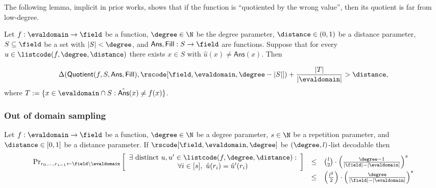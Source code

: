 The following lemma, implicit in prior works, shows that if the function is ``quotiented by the wrong value'', then its quotient is far from low-degree.

\begin{lemma}\label{lemma:quotienting}
    Let $f:\evaldomain\rightarrow\field$ be a function, $\degree\in\N$ be the degree parameter, $\distance\in(0,1)$
    be a distance parameter, $S\subseteq\field$ be a set with $|S|<\degree$, and $\mathsf{Ans},\mathsf{Fill}:S\rightarrow\field$ are functions. Suppose that for every $u\in\listcode(f,\degree,\distance)$ there exists $x\in S$ with $\hat{u}(x)\neq\mathsf{Ans}(x)$. Then

    \[
            \Delta(\mathsf{Quotient}(f,S,\mathsf{Ans},\mathsf{Fill}),\rscode[\field,\evaldomain,\degree-|S|])+\frac{|T|}{|\evaldomain|}>\distance,
    \]
    where $T:=\{x\in\evaldomain\cap S: \hat{\mathsf{Ans}}(x)\neq f(x)\}$.
\end{lemma}

\subsubsection{Out of domain sampling}\label{sec:out_of_domain_smpl}
\begin{lemma}\label{lemma:out_of_domain_smpl}
    Let $f:\evaldomain\rightarrow\field$ be a function, $\degree\in\N$ be a degree parameter, $s\in\N$ be a repetition parameter, and $\distance\in[0,1]$ be a distance parameter. If $\rscode[\field,\evaldomain,\degree]$ be $(\degree,l)$-list decodable then
        \[
        \begin{array}{rcl}
        \Pr_{\substack{r_0, \ldots, r_{s-1} \gets \field \setminus \evaldomain}}
        \left[
        \begin{array}{c}
            \exists \text{ distinct } u, u' \in \listcode(f, \degree, \distance): \\
            \forall i \in [s],\ \hat{u}(r_i) = \hat{u}'(r_i)
        \end{array}
        \right]
        & \leq & \binom{l}{2} \cdot \left( \frac{\degree - 1}{|\field| - |\evaldomain|} \right)^s \\
        & \leq & \left( \frac{l^2}{2} \right) \cdot \left( \frac{\degree}{|\field| - |\evaldomain|} \right)^s
        \end{array}
        \]



\end{lemma}

